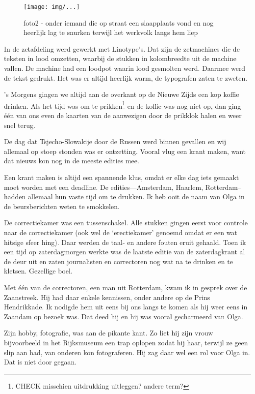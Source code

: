 \documentclass[12pt,twoside, openright]{memoir}
\begin{document}
\begin{figure}[t]
\texttt{[image: img/...]}
\caption{foto2 - onder iemand die op straat een slaapplaats vond en nog heerlijk lag te snurken terwijl het werkvolk langs hem liep}
\end{figure}

In de zetafdeling werd gewerkt met Linotype's. Dat zijn de zetmachines die de teksten in lood omzetten, waarbij de stukken in kolombreedte uit de machine vallen. De machine had een loodpot waarin lood gesmolten werd. Daarmee werd de tekst gedrukt. Het was er altijd heerlijk warm, de typografen zaten te zweten.

's Morgens gingen we altijd aan de overkant op de Nieuwe Zijds een kop koffie drinken. Als het tijd was om te prikken\footnote{CHECK misschien uitdrukking uitleggen? andere term?} en de koffie was nog niet op, dan ging één van ons even de kaarten van de aanwezigen door de prikklok halen en weer snel terug.

De dag dat Tsjecho-Slowakije door de Russen werd 
binnen gevallen en wij allemaal op stoep stonden was er ontzetting. Vooral vlug een krant maken, want dat nieuws kon nog in de meeste edities mee. 

Een krant maken is altijd een spannende klus, omdat er elke dag iets gemaakt moet worden met een deadline. De edities---Amsterdam, Haarlem, Rotterdam--hadden allemaal hun vaste tijd om te drukken. Ik heb ooit de naam van Olga in de beursberichten weten te smokkelen. 

De correctiekamer was een tussenschakel. Alle stukken gingen eerst voor controle naar de correctiekamer (ook wel de `erectiekamer' genoemd omdat er een wat hitsige sfeer hing). Daar werden de taal- en andere fouten eruit gehaald. Toen ik een tijd op zaterdagmorgen werkte was de laatste editie van de zaterdagkrant al de deur uit en zaten journalisten en correctoren nog wat na te drinken en te kletsen. Gezellige boel. 

Met één van de correctoren, een man uit Rotterdam, kwam ik in gesprek over de Zaanstreek. Hij had daar enkele kennissen, onder andere op de Prins Hendrikkade. Ik nodigde hem uit eens bij ons langs te komen als hij weer eens in Zaandam op bezoek was. Dat deed hij en hij was vooral gecharmeerd van Olga. 

Zijn hobby, fotografie, was aan de pikante kant. Zo liet hij  zijn vrouw bijvoorbeeld in het Rijksmuseum een trap oplopen zodat hij haar, terwijl ze geen slip aan had, van onderen kon fotograferen. Hij zag daar wel een rol voor Olga in. Dat is niet door gegaan. 
\end{document}
